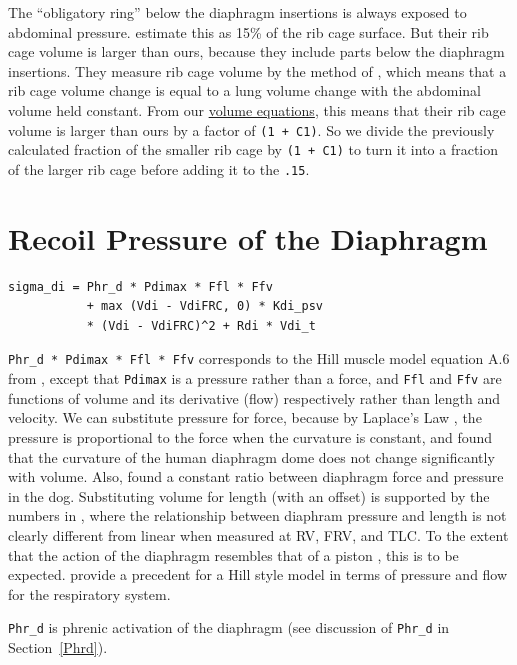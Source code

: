 \documentclass[12pt,openany,oneside]{book}
\newcommand{\inquotes}[1]{{{``#1''}}}
\begin{document}
\label{rib cage volume}
The \inquotes{obligatory ring} below the diaphragm insertions is always
exposed to abdominal pressure. \citet{Mead01091982} estimate this as
15\% of the rib cage surface. But their rib cage volume is larger
than ours, because they include parts below the diaphragm insertions.
They measure rib cage volume by the method of \citet{Konno1967}, which
means that a rib cage volume change is equal to a lung volume change
with the abdominal volume held constant. From our \hyperref[The
Volume Equations]{volume equations}, this means that their rib cage
volume is larger than ours by a factor of \verb~(1 + C1)~. So we
divide the previously calculated fraction of the smaller rib cage by
\verb~(1 + C1)~ to turn it into a fraction of the larger rib cage
before adding it to the \verb~.15~.

\filbreak
\section{Recoil Pressure of the Diaphragm}

\begin{verbatim}
sigma_di = Phr_d * Pdimax * Ffl * Ffv
           + max (Vdi - VdiFRC, 0) * Kdi_psv 
           * (Vdi - VdiFRC)^2 + Rdi * Vdi_t
\end{verbatim}

\verb~Phr_d * Pdimax * Ffl * Ffv~ corresponds to the Hill muscle model
equation A.6 from \citet{Ratnovsky20031771}, except that \verb~Pdimax~
is a pressure rather than a force, and \verb~Ffl~ and \verb~Ffv~ are
functions of volume and its derivative (flow) respectively rather than
length and velocity. We can substitute pressure for force, because by
Laplace's Law \citep{laplace1808traite}, the pressure is proportional
to the force when the curvature is constant, and \citet{Braun01081982}
found that the curvature of the human diaphragm dome does not change
significantly with volume. Also, \citet{Kim01091976} found a constant
ratio between diaphragm force and pressure in the dog. Substituting
volume for length (with an offset) is supported by the numbers in
\citet{Cluzel01052000}, where the relationship between diaphram
pressure and length is not clearly different from linear when measured
at RV, FRV, and TLC. To the extent that the action of the diaphragm
resembles that of a piston \citep{Kim01091976}, this is to be
expected. \citet{Younes01101981} provide a precedent for a Hill style
model in terms of pressure and flow for the respiratory system.

\verb~Phr_d~ is phrenic activation of the diaphragm (see discussion of
\verb~Phr_d~ in Section~\ref{Phrd}).
\end{document}
